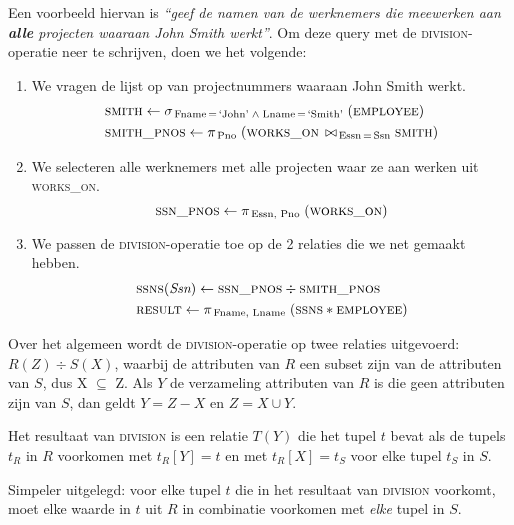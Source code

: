 Een voorbeeld hiervan is \textit{``geef de namen van de werknemers die meewerken aan \textbf{alle} projecten waaraan John Smith werkt''}. Om deze query met de \textsc{division}-operatie neer te schrijven, doen we het volgende:
\begin{enumerate}
	\item We vragen de lijst op van projectnummers waaraan John Smith werkt.
	\vspace{-2mm}
	\begin{align*}
	& \textsc{smith} \leftarrow \sigma_{\,\text{Fname} \,=\, \text{`John'} \; \wedge \; \text{Lname} \,=\, \text{`Smith'}} \;(\textsc{employee}) \\
	& \textsc{smith\_pnos} \leftarrow \pi_{\,\text{Pno}} \;(\textsc{works\_on} \,\bowtie_{\,\text{Essn} \,=\, \text{Ssn}} \textsc{smith})
	\end{align*}
	
	\item We selecteren alle werknemers met alle projecten waar ze aan werken uit \textsc{works\_on}.
	\vspace{-2mm}
	\[ \textsc{ssn\_pnos} \leftarrow \pi_{\,\text{Essn, Pno}} \;(\textsc{works\_on}) \]
	
	\item We passen de \textsc{division}-operatie toe op de 2 relaties die we net gemaakt hebben.
	\vspace{-2mm}
	\begin{align*}
	& \textsc{ssns}(\textit{Ssn}) \leftarrow \textsc{ssn\_pnos} \div \textsc{smith\_pnos}\\
	& \textsc{result} \leftarrow \pi_{\,\text{Fname, Lname}} \;(\textsc{ssns} * \textsc{employee})
	\end{align*}
\end{enumerate}
Over het algemeen wordt de \textsc{division}-operatie op twee relaties uitgevoerd: $R(Z) \div S(X)$, waarbij de attributen van $R$ een subset zijn van de attributen van $S$, dus X $\subseteq$ Z. Als $Y$ de verzameling attributen van $R$ is die geen attributen zijn van $S$, dan geldt $Y = Z-X$ en $Z = X \cup Y$.

Het resultaat van \textsc{division} is een relatie $T(Y)$ die het tupel $t$ bevat als de tupels $t_R$ in $R$ voorkomen met $t_R[Y] = t$ en met $t_R[X] = t_S$ voor elke tupel $t_S$ in $S$.

Simpeler uitgelegd: voor elke tupel $t$ die in het resultaat van \textsc{division} voorkomt, moet elke waarde in $t$ uit $R$ in combinatie voorkomen met \textit{elke} tupel in $S$.

